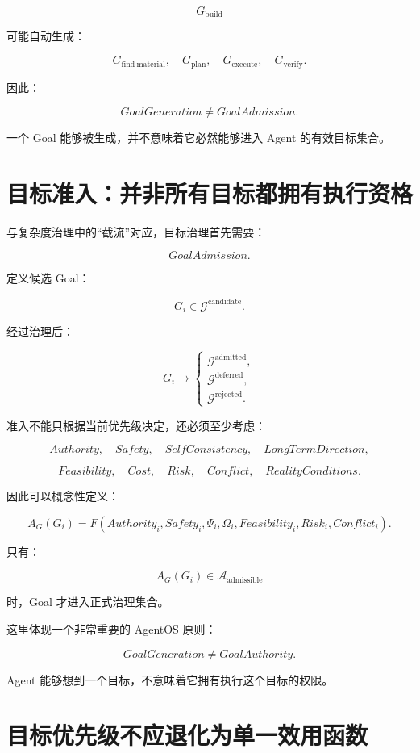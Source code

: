 \[
G_{\mathrm{build}}
\]

可能自动生成：

\[
G_{\mathrm{find\ material}},
\quad
G_{\mathrm{plan}},
\quad
G_{\mathrm{execute}},
\quad
G_{\mathrm{verify}}.
\]

因此：

\[
\boxed{
GoalGeneration
\neq
GoalAdmission.
}
\]

一个 Goal 能够被生成，并不意味着它必然能够进入 Agent 的有效目标集合。


\section{目标准入：并非所有目标都拥有执行资格}

与复杂度治理中的``截流''对应，目标治理首先需要：

\[
\boxed{
Goal Admission.
}
\]

定义候选 Goal：

\[
G_i\in\mathcal G^{\mathrm{candidate}}.
\]

经过治理后：

\[
G_i
\longrightarrow
\begin{cases}
\mathcal G^{\mathrm{admitted}},\\
\mathcal G^{\mathrm{deferred}},\\
\mathcal G^{\mathrm{rejected}}.
\end{cases}
\]

准入不能只根据当前优先级决定，还必须至少考虑：

\[
Authority,
\quad
Safety,
\quad
SelfConsistency,
\quad
LongTermDirection,
\]

\[
Feasibility,
\quad
Cost,
\quad
Risk,
\quad
Conflict,
\quad
RealityConditions.
\]

因此可以概念性定义：

\[
A_G(G_i)
=
F(
Authority_i,
Safety_i,
\Psi_i,
\Omega_i,
Feasibility_i,
Risk_i,
Conflict_i
).
\]

只有：

\[
A_G(G_i)\in\mathcal A_{\mathrm{admissible}}
\]

时，Goal 才进入正式治理集合。

这里体现一个非常重要的 AgentOS 原则：

\[
\boxed{
GoalGeneration
\neq
GoalAuthority.
}
\]

Agent 能够想到一个目标，不意味着它拥有执行这个目标的权限。


\section{目标优先级不应退化为单一效用函数}

